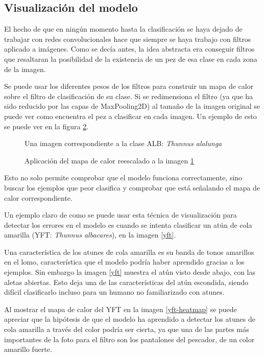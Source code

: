 \subsection{Visualización del modelo}

El hecho de que en ningún momento hasta la clasificación se haya dejado de trabajar con redes convolucionales hace que siempre se haya trabajo con filtros aplicado a imágenes. Como se decía antes, la idea abstracta era conseguir filtros que resaltaran la posibilidad de la existencia de un pez de esa clase en cada zona de la imagen.

Se puede usar los diferentes pesos de los filtros para construir un mapa de calor sobre el filtro de clasificación de su clase. Si se redimensiona el filtro (ya que ha sido reducido por las capas de MaxPooling2D) al tamaño de la imagen original se puede ver como encuentra el pez a clasificar en cada imagen. Un ejemplo de esto se puede ver en la figura \ref{fc-heatmap}.

\begin{figure}
    \caption{Una imagen correspondiente a la clase ALB: \textit{Thunnus alalunga}}
\label{fc-fish}
\end{figure}

\begin{figure}
    \caption{Aplicación del mapa de calor reescalado a la imagen \ref{fc-fish}}
\label{fc-heatmap}
\end{figure}

Esto no solo permite comprobar que el modelo funciona correctamente, sino buscar los ejemplos que peor clasifica y comprobar que está señalando el mapa de calor correspondiente.

Un ejemplo claro de como se puede usar esta técnica de visualización para detectar los errores en el modelo es cuando se intenta clasificar un atún de cola amarilla (YFT: \textit{Thunnus albacares}), en la imagen \ref{yft}.

Una característica de los atunes de cola amarilla es su banda de tonos amarillos en el lomo, característica que el modelo podría haber aprendido gracias a los ejemplos. Sin embargo la imagen \ref{yft} muestra el atún visto desde abajo, con las aletas abiertas. Esto deja una de las características del atún escondida, siendo difícil clasificarlo incluso para un humano no familiarizado con atunes.

Al mostrar el mapa de calor del YFT en la imagen \ref{yft-heatmap} se puede apreciar que la hipótesis de que el modelo ha aprendido a detectar los atunes de cola amarilla a través del color podría ser cierta, ya que una de las partes más importantes de la foto para el filtro son los pantalones del pescador, de un color amarillo fuerte.

